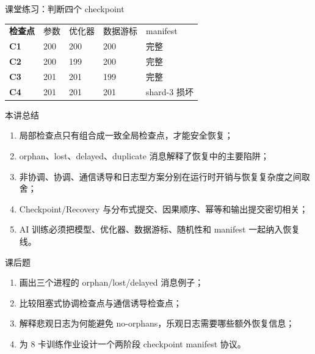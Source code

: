 \documentclass[UTF8,fontset=none,aspectratio=169,10pt]{beamer}
\begin{document}
\begin{frame}{课堂练习：判断四个 checkpoint}
\begin{tabularx}{\linewidth}{>{\bfseries}p{2.3cm}XXXX}
\toprule
检查点 & 参数 & 优化器 & 数据游标 & manifest \\
C1 & 200 & 200 & 200 & 完整 \\
C2 & 200 & 199 & 200 & 完整 \\
C3 & 201 & 201 & 199 & 完整 \\
C4 & 201 & 201 & 201 & shard-3 损坏 \\
\bottomrule
\end{tabularx}
\vfill
{}
\end{frame}

\begin{frame}{本讲总结}
\begin{enumerate}
  \item 局部检查点只有组合成一致全局检查点，才能安全恢复；
  \item orphan、lost、delayed、duplicate 消息解释了恢复中的主要陷阱；
  \item 非协调、协调、通信诱导和日志型方案分别在运行时开销与恢复复杂度之间取舍；
  \item Checkpoint/Recovery 与分布式提交、因果顺序、幂等和输出提交密切相关；
  \item AI 训练必须把模型、优化器、数据游标、随机性和 manifest 一起纳入恢复线。
\end{enumerate}
\vfill
{}
\end{frame}

\begin{frame}{课后题}
\begin{enumerate}
  \item 画出三个进程的 orphan/lost/delayed 消息例子；
  \item 比较阻塞式协调检查点与通信诱导检查点；
  \item 解释悲观日志为何能避免 no-orphans，乐观日志需要哪些额外恢复信息；
  \item 为 8 卡训练作业设计一个两阶段 checkpoint manifest 协议。
\end{enumerate}
\end{frame}
\end{document}
